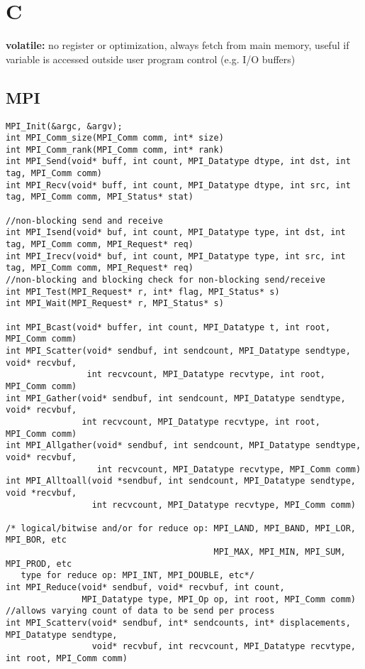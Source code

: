 \documentclass{article}
\begin{document}
\newpage



\section{C}

\textbf{volatile:} no register or optimization, always fetch from main memory, useful if variable is accessed outside user program control (e.g. I/O buffers)

\subsection{MPI}

\begin{verbatim}
MPI_Init(&argc, &argv);
int MPI_Comm_size(MPI_Comm comm, int* size)
int MPI_Comm_rank(MPI_Comm comm, int* rank)
int MPI_Send(void* buff, int count, MPI_Datatype dtype, int dst, int tag, MPI_Comm comm)
int MPI_Recv(void* buff, int count, MPI_Datatype dtype, int src, int tag, MPI_Comm comm, MPI_Status* stat)

//non-blocking send and receive
int MPI_Isend(void* buf, int count, MPI_Datatype type, int dst, int tag, MPI_Comm comm, MPI_Request* req)
int MPI_Irecv(void* buf, int count, MPI_Datatype type, int src, int tag, MPI_Comm comm, MPI_Request* req)
//non-blocking and blocking check for non-blocking send/receive
int MPI_Test(MPI_Request* r, int* flag, MPI_Status* s)
int MPI_Wait(MPI_Request* r, MPI_Status* s)

int MPI_Bcast(void* buffer, int count, MPI_Datatype t, int root, MPI_Comm comm)
int MPI_Scatter(void* sendbuf, int sendcount, MPI_Datatype sendtype, void* recvbuf,
                int recvcount, MPI_Datatype recvtype, int root, MPI_Comm comm)
int MPI_Gather(void* sendbuf, int sendcount, MPI_Datatype sendtype, void* recvbuf,
               int recvcount, MPI_Datatype recvtype, int root, MPI_Comm comm)
int MPI_Allgather(void* sendbuf, int sendcount, MPI_Datatype sendtype, void* recvbuf,
                  int recvcount, MPI_Datatype recvtype, MPI_Comm comm)
int MPI_Alltoall(void *sendbuf, int sendcount, MPI_Datatype sendtype, void *recvbuf,
                 int recvcount, MPI_Datatype recvtype, MPI_Comm comm)

/* logical/bitwise and/or for reduce op: MPI_LAND, MPI_BAND, MPI_LOR, MPI_BOR, etc
                                         MPI_MAX, MPI_MIN, MPI_SUM, MPI_PROD, etc
   type for reduce op: MPI_INT, MPI_DOUBLE, etc*/
int MPI_Reduce(void* sendbuf, void* recvbuf, int count,
               MPI_Datatype type, MPI_Op op, int root, MPI_Comm comm)
//allows varying count of data to be send per process
int MPI_Scatterv(void* sendbuf, int* sendcounts, int* displacements, MPI_Datatype sendtype,
                 void* recvbuf, int recvcount, MPI_Datatype recvtype, int root, MPI_Comm comm)
\end{verbatim}
\end{document}

